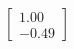 \documentclass[preview]{standalone}
\begin{document}
\begin{align*}
\begin{bmatrix} 1.00 \\ -0.49 \end{bmatrix}
\end{align*}
\end{document}
